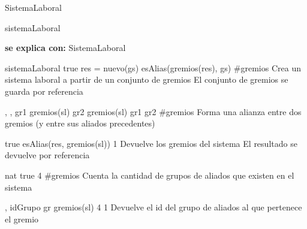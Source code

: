 \begin{interfaz}{SistemaLaboral}
\begin{iparamformales}{sistemaLaboral}

\textbf{\large se explica con:} SistemaLaboral

\end{iparamformales}

{}{sistemaLaboral}
{true}
{res = nuevo(gs) \ly esAlias(gremios(res), gs)}
{\#gremios}
{Crea un sistema laboral a partir de un conjunto de gremios}
{El conjunto de gremios se guarda por referencia}

{, , }{}
{gr1 \in gremios(sl) \ly gr2 \in gremios(sl) \ly gr1 \distinto gr2 }
{}
{\#gremios}
{Forma una alianza entre dos gremios (y entre sus aliados precedentes)}
{}

{true}
{esAlias(res, gremios(sl))}
{1}
{Devuelve los gremios del sistema}
{El resultado se devuelve por referencia}

{}{nat}
{true}
{4}
{\#gremios}
{Cuenta la cantidad de grupos de aliados que existen en el sistema}
{}

{, }{idGrupo}
{gr \in gremios(sl)}
{4}
{1}
{Devuelve el id del grupo de aliados al que pertenece el gremio}
{}

\end{interfaz}